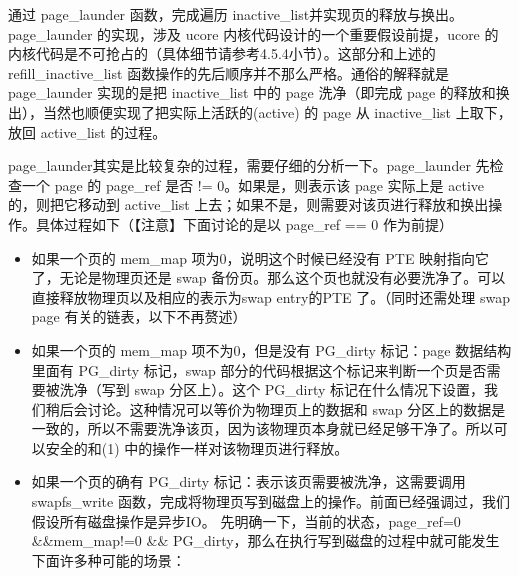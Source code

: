 通过 page\_launder 函数，完成遍历
inactive\_list并实现页的释放与换出。page\_launder 的实现，涉及 ucore
内核代码设计的一个重要假设前提，ucore
的内核代码是不可抢占的（具体细节请参考4.5.4小节）。这部分和上述的refill\_inactive\_list
函数操作的先后顺序并不那么严格。通俗的解释就是 page\_launder 实现的是把
inactive\_list 中的 page 洗净（即完成 page
的释放和换出），当然也顺便实现了把实际上活跃的(active) 的 page 从
inactive\_list 上取下，放回 active\_list 的过程。

page\_launder其实是比较复杂的过程，需要仔细的分析一下。page\_launder
先检查一个 page 的 page\_ref 是否 != 0。如果是，则表示该 page 实际上是
active 的，则把它移动到 active\_list
上去；如果不是，则需要对该页进行释放和换出操作。具体过程如下（【注意】下面讨论的是以
page\_ref == 0 作为前提）

\begin{itemize}
\tightlist
\item
  如果一个页的 mem\_map 项为0，说明这个时候已经没有 PTE
  映射指向它了，无论是物理页还是 swap
  备份页。那么这个页也就没有必要洗净了。可以直接释放物理页以及相应的表示为swap
  entry的PTE 了。（同时还需处理 swap page 有关的链表，以下不再赘述）
\item
  如果一个页的 mem\_map 项不为0，但是没有 PG\_dirty 标记：page
  数据结构里面有 PG\_dirty 标记，swap
  部分的代码根据这个标记来判断一个页是否需要被洗净（写到 swap
  分区上）。这个 PG\_dirty
  标记在什么情况下设置，我们稍后会讨论。这种情况可以等价为物理页上的数据和
  swap
  分区上的数据是一致的，所以不需要洗净该页，因为该物理页本身就已经足够干净了。所以可以安全的和(1)
  中的操作一样对该物理页进行释放。
\item
  如果一个页的确有 PG\_dirty 标记：表示该页需要被洗净，这需要调用
  swapfs\_write
  函数，完成将物理页写到磁盘上的操作。前面已经强调过，我们假设所有磁盘操作是异步IO。
  先明确一下，当前的状态，page\_ref=0 \&\&mem\_map!=0 \&\&
  PG\_dirty，那么在执行写到磁盘的过程中就可能发生下面许多种可能的场景：
\end{itemize}

